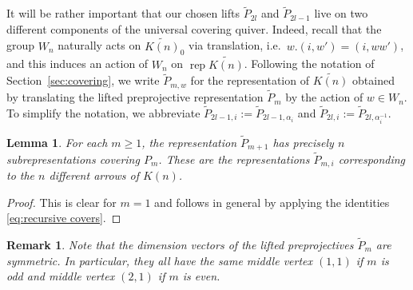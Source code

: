 \documentclass{amsart}
\newtheorem{lemma}[theorem]{Lemma}
\newtheorem{remark}[theorem]{Remark}
\numberwithin{equation}{section}
\newcommand{\rep}{\operatorname{rep}}
\begin{document}
It will be rather important that our chosen lifts $\tilde P_{2l}$ and $\tilde P_{2l-1}$ live on two different components of the universal covering quiver.
Indeed, recall that the group $W_n$ naturally acts on $\widetilde{K(n)}_0$ via translation, i.e.~$w.(i,w')=(i,ww')$, and this induces an action of $W_n$ on $\rep\widetilde{K(n)}$.
Following the notation of Section~\ref{sec:covering}, we write $\tilde P_{m,w}$ for the representation of $\widetilde{K(n)}$ obtained by translating the lifted preprojective representation $\tilde P_m$ by the action of $w\in W_n$.
To simplify the notation, we abbreviate $\tilde P_{2l-1,i}:=\tilde P_{2l-1,\alpha_i}$ and $\tilde P_{2l,i}:=\tilde P_{2l,\alpha_i^{-1}}$.
\begin{lemma}
  For each $m\ge1$, the representation $\tilde P_{m+1}$ has precisely $n$ subrepresentations covering $P_m$.
  These are the representations $\tilde P_{m,i}$ corresponding to the $n$ different arrows of $K(n)$. 
\end{lemma}
\begin{proof}
  This is clear for $m=1$ and follows in general by applying the identities \eqref{eq:recursive covers}.
\end{proof}
\begin{remark}
  Note that the dimension vectors of the lifted preprojectives $\tilde P_m$ are symmetric.
  In particular, they all have the same middle vertex $(1,1)$ if $m$ is odd and middle vertex $(2,1)$ if $m$ is even.
\end{remark}
\end{document}
